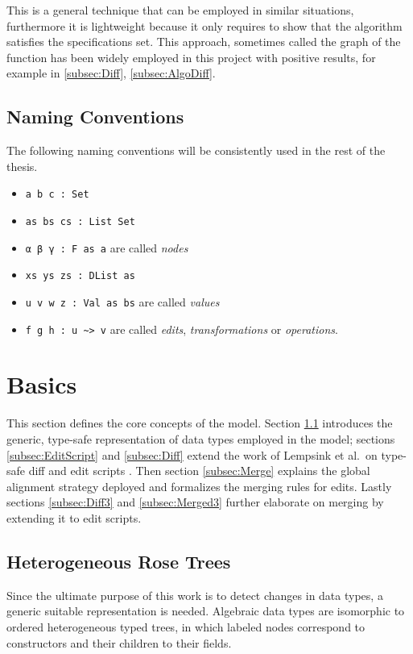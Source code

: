 \documentclass[../Thesis.tex]{subfiles}
\begin{document}
	This is a general technique that can be employed in similar 
	situations, furthermore it is lightweight because it only requires 
	to show that the algorithm satisfies the specifications set.
	This approach, sometimes called the graph of the function 
	\cite{FunctionDomains} has been widely employed in this project with 
	positive results, for example in \ref{subsec:Diff}, \ref{subsec:AlgoDiff}.
	
	\subsection{Naming Conventions}
	The following naming conventions will be consistently used in the rest of  
	the thesis.
	\begin{itemize}
		\item \texttt{a b c :\ Set}
		\item \texttt{as bs cs :\ List Set}
		\item \texttt{α β γ :\ F as a} are called \emph{nodes}
		\item \texttt{xs ys zs :\ DList as}
		\item \texttt{u v w z :\ Val as bs} are called \emph{values}
		\item \texttt{f g h :\ u \textasciitilde> v} are called  \emph{edits},
		\emph{transformations} or \emph{operations}.
	\end{itemize}

\section{Basics}
This section defines the core concepts of the model.
Section \ref{subsec:DTree} introduces the generic, type-safe representation of data types employed in the model; sections \ref{subsec:EditScript} and
\ref{subsec:Diff} extend the work of Lempsink et al.\ on type-safe diff and
edit scripts \cite{Lemp09}. 
Then section \ref{subsec:Merge} explains the global
alignment strategy deployed and formalizes the merging rules 
for edits. Lastly sections \ref{subsec:Diff3} and \ref{subsec:Merged3} further elaborate on merging by extending it to edit scripts.

	\subsection{Heterogeneous Rose Trees}
	\label{subsec:DTree}
		Since the ultimate purpose of this work is to detect changes in 
		data types, a generic suitable representation is needed. 
		Algebraic data types are isomorphic to ordered heterogeneous typed 
		trees, in which labeled nodes correspond to constructors and
		their children to their fields. 
		
\end{document}
